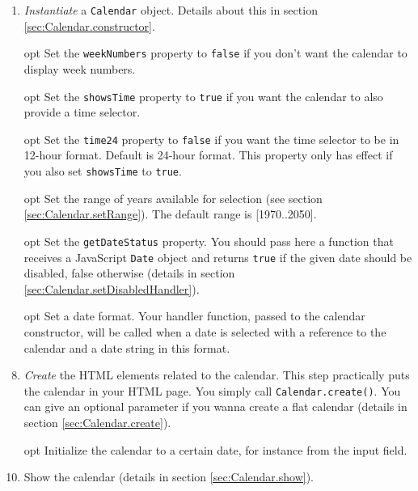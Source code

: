 \documentclass[a4paper,twoside,10pt]{dynadoc}
\begin{document}
\begin{enumerate}

\item \emph{Instantiate} a \texttt{Calendar} object.  Details about this in
section \ref{sec:Calendar.constructor}.

\item [opt] Set the \texttt{weekNumbers} property to \texttt{false} if you don't want
the calendar to display week numbers.

\item [opt] Set the \texttt{showsTime} property to \texttt{true} if you
want the calendar to also provide a time selector.

\item [opt] Set the \texttt{time24} property to \texttt{false} if you want
the time selector to be in 12-hour format.  Default is 24-hour format.  This
property only has effect if you also set \texttt{showsTime} to
\texttt{true}.

\item [opt] Set the range of years available for selection (see section
\ref{sec:Calendar.setRange}).  The default range is [1970..2050].

\item [opt] Set the \texttt{getDateStatus} property.  You should pass
here a function that receives a JavaScript \texttt{Date} object and returns
\texttt{true} if the given date should be disabled, false otherwise (details in
section \ref{sec:Calendar.setDisabledHandler}).

\item [opt] Set a date format.  Your handler function, passed to the
calendar constructor, will be called when a date is selected with a reference
to the calendar and a date string in this format.

\item \emph{Create} the HTML elements related to the calendar.  This step
practically puts the calendar in your HTML page.  You simply call
\texttt{Calendar.create()}.  You can give an optional parameter if you wanna
create a flat calendar (details in section \ref{sec:Calendar.create}).

\item [opt] Initialize the calendar to a certain date, for instance from
the input field.

\item Show the calendar (details in section \ref{sec:Calendar.show}).

\end{enumerate}
\end{document}
